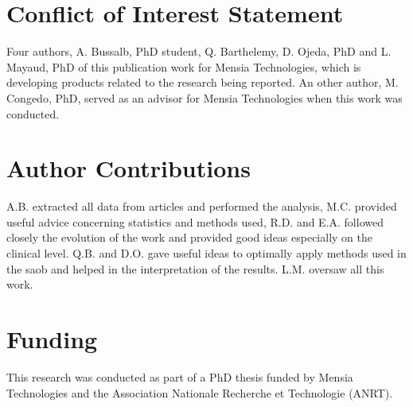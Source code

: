 
\section{Conflict of Interest Statement}
Four authors, A. Bussalb, PhD student, Q. Barthelemy, D. Ojeda, PhD and L. Mayaud, PhD of this publication work for Mensia Technologies, which is developing products related to the research being reported.
An other author, M. Congedo, PhD, served as an advisor for Mensia Technologies when this work was conducted. 

\section{Author Contributions}
A.B. extracted all data from articles and performed the analysis,  M.C. provided useful advice concerning statistics and methods used, R.D. and E.A. followed closely the evolution of the work and provided good ideas
especially on the clinical level. Q.B. and D.O. gave useful ideas to optimally apply methods used in the \gls{saob} and helped in the interpretation of the results. L.M. oversaw all this work. 

\section{Funding}
This research was conducted as part of a PhD thesis funded by Mensia Technologies and the Association Nationale Recherche et Technologie (ANRT).

